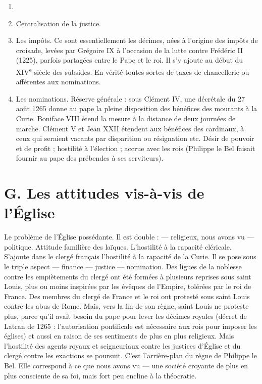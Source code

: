 \documentclass[french,twoside]{book} %
\newcommand\chapterclose{} %
\renewcommand\chapterclose{} %
\begin{document}
\begin{enumerate}[itemsep=0pt,]
\item[] \hspace{-1.5em}{\bfseries Comment se marque la centralisation ?}
\item Centralisation de la justice.
\item Les impôts. Ce sont essentiellement les décimes, nées à l’origine des impôts de croisade, levées par Grégoire IX à l’occasion de la lutte contre Frédéric II (1225), parfois partagées entre le Pape et le roi. Il s’y ajoute au début du XIV\textsuperscript{e} siècle des subsides. En vérité toutes sortes de taxes de chancellerie ou afférentes aux nominations.
\item Les nominations. Réserve générale : sous Clément IV, une décrétale du 27 août 1265 donne au pape la pleine disposition des bénéfices des mourants à la Curie. Boniface VIII étend la mesure à la distance de deux journées de marche. Clément V et Jean XXII étendent aux bénéfices des cardinaux, à ceux qui seraient vacants par disparition ou résignation etc. Désir de pouvoir et de profit ; hostilité à l’élection ; accrue avec les rois (Philippe le Bel faisait fournir au pape des prébendes à ses serviteurs).

\end{enumerate}\section[G. Les attitudes vis-à-vis de l’Église]{G. Les attitudes vis-à-vis de l’Église}
\label{c10g}
\noindent Le problème de l’Église possédante. Il est double : — religieux, nous avons vu — politique. Attitude familière des laïques. L’hostilité à la rapacité cléricale. S’ajoute dans le clergé français l’hostilité à la rapacité de la Curie. Il se pose sous le triple aspect — finance — justice — nomination. Des ligues de la noblesse contre les empiètements du clergé ont été formées à plusieurs reprises sous saint Louis, plus ou moins inspirées par les évêques de l’Empire, tolérées par le roi de France. Des membres du clergé de France et le roi ont protesté sous saint Louis contre les abus de Rome. Mais, vers la fin de son règne, saint Louis ne proteste plus, parce qu’il avait besoin du pape pour lever les décimes royales (décret de Latran de 1265 : l’autorisation pontificale est nécessaire aux rois pour imposer les églises) et aussi en raison de ses sentiments de plus en plus religieux. Mais l’hostilité des agents royaux et seigneuriaux contre les justices d’Église et du clergé contre les exactions se poursuit. C’est l’arrière-plan du règne de Philippe le Bel. Elle correspond à ce que nous avons vu — une société croyante de plus en plus consciente de sa foi, mais fort peu encline à la théocratie.
\chapterclose
\end{document}

